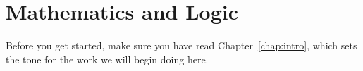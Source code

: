 \chapter{Mathematics and Logic}\label{chap:IntroToMath}

Before you get started, make sure you have read Chapter~\ref{chap:intro}, which sets the tone for the work we will begin doing here.
